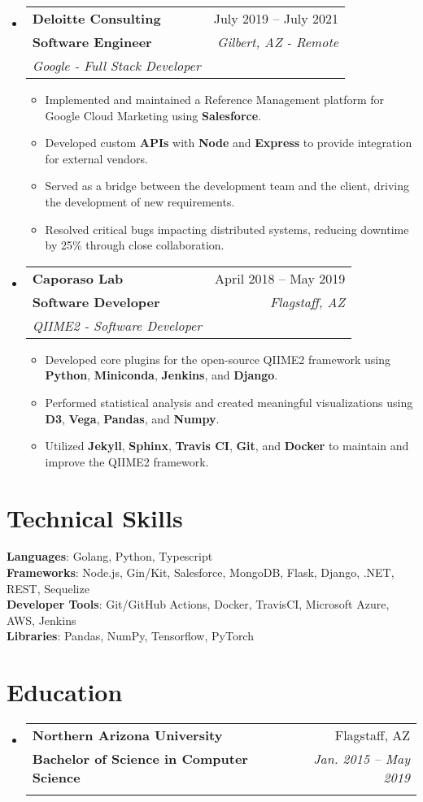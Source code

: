 \documentclass[letterpaper,11pt]{article}
\makeatletter
\newcommand{\resumeItem}[1]{
  \item\small{
    {#1 \vspace{-2pt}}
  }
}
\newcommand{\resumeSubheading}[5]{
  \vspace{-2pt}\item
    \begin{tabular*}{0.97\textwidth}[t]{l@{\extracolsep{\fill}}r}
      \textbf{#1} & #2 \\
      \textbf{\small#3} & \textit{\small #4} \\
      \textit{\small#5} \\
    \end{tabular*}\vspace{-7pt}
}
\newcommand{\resumeSubHeadingListStart}{\begin{itemize}[leftmargin=0.15in, label={}]}
\newcommand{\resumeSubHeadingListEnd}{\end{itemize}}
\newcommand{\resumeItemListStart}{\begin{itemize}}
\newcommand{\resumeItemListEnd}{\end{itemize}\vspace{-5pt}}
\makeatother
\begin{document}
\resumeSubHeadingListStart
\resumeSubheading
{Deloitte Consulting}{July 2019 -- July 2021}
{Software Engineer}{Gilbert, AZ - Remote}
{Google - Full Stack Developer}
\resumeItemListStart
\resumeItem{Implemented and maintained a Reference Management platform for Google Cloud Marketing using \textbf{Salesforce}.}
\resumeItem{Developed custom \textbf{APIs} with \textbf{Node} and \textbf{Express} to provide integration for external vendors.}
\resumeItem{Served as a bridge between the development team and the client, driving the development of new requirements.}
\resumeItem{Resolved critical bugs impacting distributed systems, reducing downtime by 25\% through close collaboration.}
\resumeItemListEnd
\resumeSubHeadingListEnd



\resumeSubHeadingListStart
\resumeSubheading
{Caporaso Lab}{April 2018 -- May 2019}
{Software Developer}{Flagstaff, AZ}
{QIIME2 - Software Developer}
\resumeItemListStart
\resumeItem{Developed core plugins for the open-source QIIME2 framework using \textbf{Python}, \textbf{Miniconda}, \textbf{Jenkins}, and \textbf{Django}.}
\resumeItem{Performed statistical analysis and created meaningful visualizations using \textbf{D3}, \textbf{Vega}, \textbf{Pandas}, and \textbf{Numpy}.}
\resumeItem{Utilized \textbf{Jekyll}, \textbf{Sphinx}, \textbf{Travis CI}, \textbf{Git}, and \textbf{Docker} to maintain and improve the QIIME2 framework.}
\resumeItemListEnd
\resumeSubHeadingListEnd


\section{Technical Skills}
\begin{itemize}[leftmargin=0.15in, label={}]
 \small{\item{
       \textbf{Languages}{: Golang, Python, Typescript} \\
       \textbf{Frameworks}{: Node.js, Gin/Kit, Salesforce, MongoDB, Flask, Django, .NET, REST, Sequelize} \\
       \textbf{Developer Tools}{: Git/GitHub Actions, Docker, TravisCI, Microsoft Azure, AWS, Jenkins} \\
       \textbf{Libraries}{: Pandas, NumPy, Tensorflow, PyTorch}
       }}
\end{itemize}

\section{Education}
\resumeSubHeadingListStart
\resumeSubheading
{Northern Arizona University}{Flagstaff, AZ}
{\normalfont Bachelor of Science in Computer Science}{Jan. 2015 -- May 2019}
{}
\resumeSubHeadingListEnd

\end{document}

